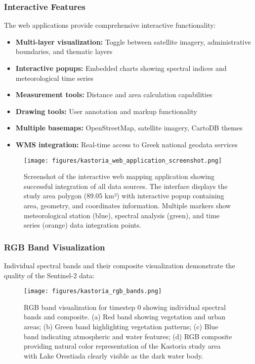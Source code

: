 \documentclass[a4paper,12pt]{article}
\begin{document}
\subsubsection{Interactive Features}

The web applications provide comprehensive interactive functionality:

\begin{itemize}
    \item \textbf{Multi-layer visualization:} Toggle between satellite imagery, administrative boundaries, and thematic layers
    \item \textbf{Interactive popups:} Embedded charts showing spectral indices and meteorological time series
    \item \textbf{Measurement tools:} Distance and area calculation capabilities
    \item \textbf{Drawing tools:} User annotation and markup functionality
    \item \textbf{Multiple basemaps:} OpenStreetMap, satellite imagery, CartoDB themes
    \item \textbf{WMS integration:} Real-time access to Greek national geodata services
\end{itemize}

\begin{figure}[H]
    \centering
    \texttt{[image: figures/kastoria\_web\_application\_screenshot.png]}
    \caption{Screenshot of the interactive web mapping application showing successful integration of all data sources. The interface displays the study area polygon (89.05 km²) with interactive popup containing area, geometry, and coordinates information. Multiple markers show meteorological station (blue), spectral analysis (green), and time series (orange) data integration points.}
    \label{fig:web_app}
\end{figure}

\subsubsection{RGB Band Visualization}

Individual spectral bands and their composite visualization demonstrate the quality of the Sentinel-2 data:

\begin{figure}[H]
    \centering
    \texttt{[image: figures/kastoria\_rgb\_bands.png]}
    \caption{RGB band visualization for timestep 0 showing individual spectral bands and composite. (a) Red band showing vegetation and urban areas; (b) Green band highlighting vegetation patterns; (c) Blue band indicating atmospheric and water features; (d) RGB composite providing natural color representation of the Kastoria study area with Lake Orestiada clearly visible as the dark water body.}
    \label{fig:rgb_bands}
\end{figure}
\end{document}

